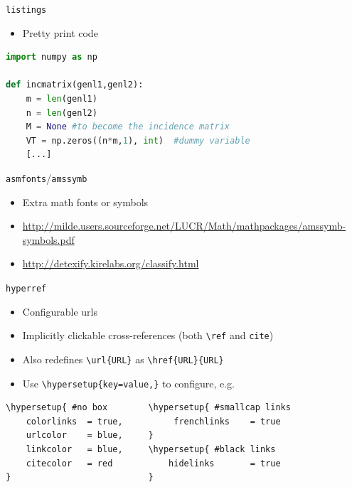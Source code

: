\documentclass[english]{beamer}
\let\olditem\item
\renewcommand{\item}{\setlength{\itemsep}{\fill}\olditem}
\let\textttt\texttt
\renewcommand{\texttt}[1]{\colorbox{gray!10}{\textttt{#1}}}
\begin{document}
\begin{frame}[fragile]{\texttt{listings}}
    \begin{itemize}
        \item Pretty print code
    \end{itemize}

 

\lstset{basicstyle=\ttfamily, style=mystyle}
    \begin{lstlisting}[language=Python]
import numpy as np
 
def incmatrix(genl1,genl2):
    m = len(genl1)
    n = len(genl2)
    M = None #to become the incidence matrix
    VT = np.zeros((n*m,1), int)  #dummy variable
    [...]
\end{lstlisting}
\end{frame}

\begin{frame}{\texttt{asmfonts}/\texttt{amssymb}}
    \begin{itemize}
        \item Extra math fonts or symbols
        \item \url{http://milde.users.sourceforge.net/LUCR/Math/mathpackages/amssymb-symbols.pdf}
        \item \url{http://detexify.kirelabs.org/classify.html}
    \end{itemize}
\end{frame}

\begin{frame}[fragile]{\texttt{hyperref}}
    \begin{itemize}
        \item Configurable urls
        \item Implicitly clickable cross-references (both \verb|\ref| and \verb|cite|)
        \item Also redefines \verb|\url{URL}| as \verb|\href{URL}{URL}|
        \item Use \verb|\hypersetup{key=value,}| to configure, e.g.
    \end{itemize}
\begin{verbatim}
\hypersetup{ #no box        \hypersetup{ #smallcap links
    colorlinks  = true,          frenchlinks    = true
    urlcolor    = blue,     }
    linkcolor   = blue,     \hypersetup{ #black links
    citecolor   = red           hidelinks       = true
}                           }
\end{verbatim}
\end{frame}
\end{document}
